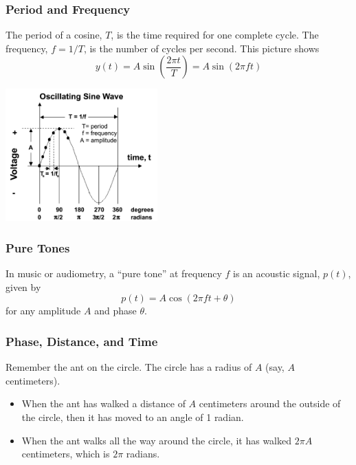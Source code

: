 \documentclass{beamer}
\begin{document}
\begin{frame}
  \frametitle{Period and Frequency}

  The period of a cosine, $T$, is the time required for one complete
  cycle.  The frequency, $f=1/T$, is the number of cycles per second.
  This picture shows
  \[
  y(t)  = A\sin\left(\frac{2\pi t}{T}\right) = A\sin\left(2\pi ft\right)
  \]
  \centerline{\includegraphics[height=2in]{Oscillating_sine_wave.png}}
\end{frame}  

\begin{frame}
  \frametitle{Pure Tones}
  
  In music or audiometry, a ``pure tone'' at frequency $f$ is an
  acoustic signal, $p(t)$, given by
  \[
  p(t) = A\cos\left(2\pi ft+\theta\right)
  \]
  for any amplitude $A$ and phase $\theta$.
  \vspace*{3mm}
  
  \centerline{}
\end{frame}
  
\begin{frame}
  \frametitle{Phase, Distance, and Time}
  
  Remember the ant on the circle.  The circle has a radius of $A$ (say, $A$ centimeters).
  \begin{itemize}
  \item When the ant has walked a distance of $A$ centimeters around
    the outside of the circle, then it has moved to an angle of 1 radian.
  \item When the ant walks all the way around the circle, it has
    walked $2\pi A$ centimeters, which is $2\pi$ radians.
  \end{itemize}
\end{frame}
\end{document}
